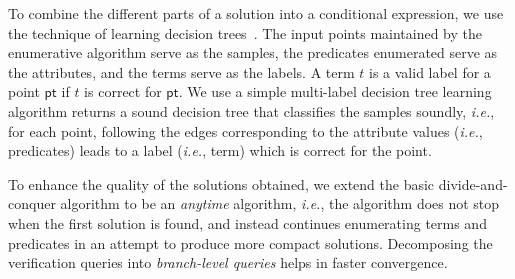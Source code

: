 \documentclass{llncs}
\newcommand{\ie}{\emph{i.e.}}
\newcommand\Point{\mathsf{pt}}
\newcommand\Expr{e}
\newcommand\Term{t}
\renewcommand{\paragraph}[1]{\par\noindent\textbf{#1.}}
\begin{document}
To combine the different parts of a solution into a conditional
expression, we use the technique of learning decision
trees~\cite{quinlan-86,bishop-book}.  The input points maintained by
the enumerative algorithm serve as the samples, the predicates
enumerated serve as the attributes, and the terms serve as the labels.
A term $\Term$ is a valid label for a point $\Point$ if $\Term$ is
correct for $\Point$.  We use a simple multi-label decision tree
learning algorithm returns a sound decision tree that classifies the
samples soundly, \ie, for each point, following the edges
corresponding to the attribute values (\ie, predicates) leads to a
label (\ie, term) which is correct for the point.

To enhance the quality of the solutions obtained, we extend the basic
divide-and-conquer algorithm to be an \emph{anytime}
algorithm, \ie, the algorithm does not stop when the first
solution is found, and instead continues enumerating terms and
predicates in an attempt to produce more compact
solutions. Decomposing the verification queries into
\emph{branch-level queries} helps in faster convergence.



\end{document}
